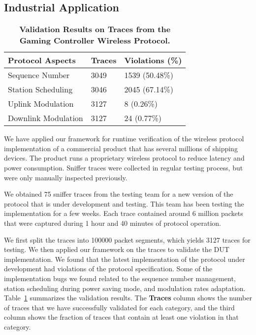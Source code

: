 \subsection{Industrial Application}
\label{subsec:xbox}

\begin{table}[t!]
  \centering
  \begin{tabular}{lll}
    \toprule
    \textbf{Protocol Aspects} & \textbf{Traces} & \textbf{Violations (\%)}\\
    \midrule
    Sequence Number & 3049 & 1539 (50.48\%) \\
    Station Scheduling & 3046 & 2045 (67.14\%) \\
    Uplink Modulation & 3127 & 8 (0.26\%) \\
    Downlink Modulation & 3127 & 24 (0.77\%) \\
    \bottomrule
  \end{tabular}
  \caption{\textbf{Validation Results on Traces from the Gaming Controller Wireless Protocol.}}
  \label{tab:xbox}
\end{table}

We have applied our framework for runtime verification of the wireless protocol
implementation of a commercial product that has several millions of shipping
devices. The product runs a proprietary wireless protocol to reduce latency and
power consumption. Sniffer traces were collected in regular testing process, but
were only manually inspected previously. 

We obtained 75 sniffer traces from the testing team for a new version of the
protocol that is under development and testing. This team has been testing the
implementation for a few weeks.  Each trace contained around 6 million packets
that were captured during 1 hour and 40 minutes of protocol operation.

We first split the traces into \num{100000} packet segments, which yields \num{3127}
traces for testing.  We then applied our framework on the traces to validate the
DUT implementation. We found that the latest implementation of the protocol
under development had violations of the protocol specification.  Some of the
implementation bugs we found related to the sequence number management, station
scheduling during power saving mode, and modulation rates adaptation.
Table~\ref{tab:xbox} summarizes the validation results. The \textbf{Traces}
column shows the number of traces that we have successfully validated for each
category, and the third column shows the fraction of traces that contain at
least one violation in that category.

